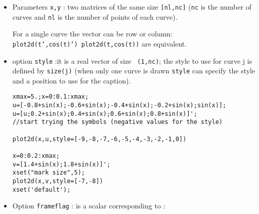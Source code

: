 

\begin{itemize}


\item Parameters {\tt x,y} : two matrices of the same size {\tt [nl,nc]} ({\tt nc} 
is the number of curves and {\tt nl} is the number of points of each
curve).

For a single curve the vector can be row or column: \\
{\tt plot2d(t',cos(t)')  plot2d(t,cos(t))} are equivalent.


\item option {\tt style}  	:it is a real vector of size {\tt
(1,nc)}; the style 
to use for curve j is defined by {\tt size(j)} (when only one curve is drawn 
{\tt style} can specify the style and a position to use for the
caption).

\begin{verbatim}
xmax=5.;x=0:0.1:xmax;
u=[-0.8+sin(x);-0.6+sin(x);-0.4+sin(x);-0.2+sin(x);sin(x)];
u=[u;0.2+sin(x);0.4+sin(x);0.6+sin(x);0.8+sin(x)]';   
//start trying the symbols (negative values for the style)

plot2d(x,u,style=[-9,-8,-7,-6,-5,-4,-3,-2,-1,0])

x=0:0.2:xmax; 
v=[1.4+sin(x);1.8+sin(x)]'; 
xset("mark size",5);
plot2d(x,v,style=[-7,-8])
xset('default');
\end{verbatim}



\item Option {\tt frameflag} : is a scalar corresponding to :


\end{itemize}
